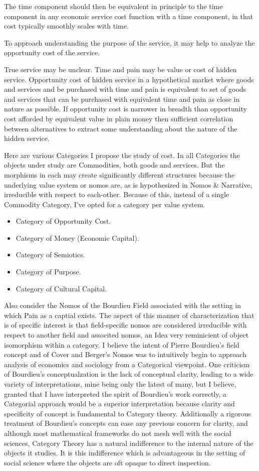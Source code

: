 \documentclass[11pt]{book}
\begin{document}
The time component should then be equivalent in principle to the time component in any economic service cost function with a time component, in that cost typically smoothly scales with time.

To approach understanding the purpose of the service, it may help to analyze the opportunity cost of the service.

True service may be unclear. Time and pain may be value or cost of hidden service. Opportunity cost of hidden service in a hypothetical market where goods and services and be purchased with time and pain is equivalent to set of goods and services that can be purchased with equivalent time and pain as close in nature as possible.
If opportunity cost is narrower in breadth than opportunity cost afforded by equivalent value in plain money then sufficient correlation between alternatives to extract some understanding about the nature of the hidden service.

Here are various Categories I propose the study of cost. In all Categories the objects under study are Commodities, both goods and services. But the morphisms in each may create significantly different structures because the underlying value system or nomos are, as is hypothesized in Nomos \& Narrative, irreducible with respect to each-other. Because of this, instead of a single Commodity Category, I've opted for a category per value system.

\begin{itemize}
	\item Category of Opportunity Cost.
	\item Category of Money (Economic Capital).
	\item Category of Semiotics.
	\item Category of Purpose.
	\item Category of Cultural Capital.
\end{itemize}

Also consider the Nomos of the Bourdieu Field associated with the setting in which Pain as a captial exists. The aspect of this manner of characterization that is of specific interest is that field-specific nomos are considered irreducible with respect to another field and associted nomos, an Idea very reminicient of object isomorphism within a category. I believe the intent of Pierre Bourdieu's field concept and of Cover and Berger's Nomos was to intuitively begin to approach analysis of economics and sociology from a Categorical viewpoint. One criticism of Bourdieu's conceptualzation is the lack of conceptual clarity, leading to a wide variety of interpretations, mine being only the latest of many, but I believe, granted that I have interpreted the spirit of Bourdieu's work correctly, a Categorial approach would be a superior interpretation because clarity and specificity of concept is fundamental to Category theory. Additionally a rigorous treatment of Bourdieu's concepts can ease any previous concern for clarity, and although most mathematical frameworks do not mesh well with the social sciences, Category Theory has a natural indifference to the internal nature of the objects it studies. It is this indifference which is advantageous in the setting of social science where the objects are oft opaque to direct inspection.
\end{document}
